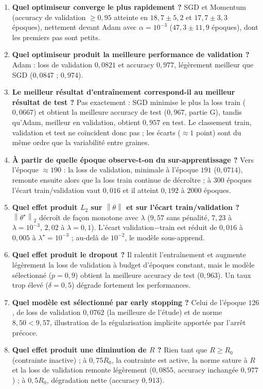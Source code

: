 \documentclass[11pt,a4paper]{article}
\newcommand{\norm}[1]{\left\lVert #1 \right\rVert}
\begin{document}
\begin{enumerate}
  \item \textbf{Quel optimiseur converge le plus rapidement ?} SGD et Momentum (accuracy de validation $\ge 0{,}95$ atteinte en $18{,}7 \pm 5{,}2$ et $17{,}7 \pm 3{,}3$ époques), nettement devant Adam avec $\alpha = 10^{-3}$ ($47{,}3 \pm 11{,}9$ époques), dont les premiers pas sont petits.
  \item \textbf{Quel optimiseur produit la meilleure performance de validation ?} Adam : loss de validation $0{,}0821$ et accuracy $0{,}977$, légèrement meilleur que SGD ($0{,}0847$ ; $0{,}974$).
  \item \textbf{Le meilleur résultat d'entraînement correspond-il au meilleur résultat de test ?} Pas exactement : SGD minimise le plus la loss train ($0{,}0667$) et obtient la meilleure accuracy de test ($0{,}967$, partie G), tandis qu'Adam, meilleur en validation, obtient $0{,}957$ en test. Le classement train, validation et test ne coïncident donc pas ; les écarts ($\approx 1$ point) sont du même ordre que la variabilité entre graines.
  \item \textbf{À partir de quelle époque observe-t-on du sur-apprentissage ?} Vers l'époque $\approx 190$ : la loss de validation, minimale à l'époque $191$ ($0{,}0714$), remonte ensuite alors que la loss train continue de décroître ; à $300$ époques l'écart train/validation vaut $0{,}016$ et il atteint $0{,}192$ à $2000$ époques.
  \item \textbf{Quel effet produit $L_2$ sur $\norm{\theta}$ et sur l'écart train/validation ?} $\norm{\theta^\star}_2$ décroît de façon monotone avec $\lambda$ ($9{,}57$ sans pénalité, $7{,}23$ à $\lambda = 10^{-3}$, $2{,}02$ à $\lambda = 0{,}1$). L'écart validation$-$train est réduit de $0{,}016$ à $0{,}005$ à $\lambda^\star = 10^{-3}$ ; au-delà de $10^{-2}$, le modèle sous-apprend.
  \item \textbf{Quel effet produit le dropout ?} Il ralentit l'entraînement et augmente légèrement la loss de validation à budget d'époques constant, mais le modèle sélectionné ($p = 0{,}9$) obtient la meilleure accuracy de test ($0{,}963$). Un taux trop élevé ($\delta = 0{,}5$) dégrade fortement les performances.
  \item \textbf{Quel modèle est sélectionné par early stopping ?} Celui de l'époque $126$, de loss de validation $0{,}0762$ (la meilleure de l'étude) et de norme $8{,}50 < 9{,}57$, illustration de la régularisation implicite apportée par l'arrêt précoce.
  \item \textbf{Quel effet produit une diminution de $R$ ?} Rien tant que $R \ge R_0$ (contrainte inactive) ; à $0{,}75R_0$, la contrainte est active, la norme sature à $R$ et la loss de validation remonte légèrement ($0{,}0855$, accuracy inchangée $0{,}977$) ; à $0{,}5R_0$, dégradation nette (accuracy $0{,}913$).

\end{enumerate}
\end{document}
